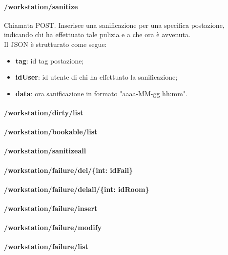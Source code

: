 \paragraph{/workstation/sanitize}
Chiamata POST. Inserisce una sanificazione per una specifica postazione, indicando chi ha effettuato tale pulizia e a che ora è avvenuta.\\
Il JSON è strutturato come segue:
\begin{itemize}
	\item \textbf{tag}: id tag postazione;
	\item \textbf{idUser}: id utente di chi ha effettuato la sanificazione;
	\item \textbf{data}: ora sanificazione in formato "aaaa-MM-gg hh:mm".
\end{itemize}

\paragraph{/workstation/dirty/list}
\paragraph{/workstation/bookable/list}
\paragraph{/workstation/sanitizeall}
\paragraph{/workstation/failure/del/\{int: idFail\}}
\paragraph{/workstation/failure/delall/\{int: idRoom\}}
\paragraph{/workstation/failure/insert}
\paragraph{/workstation/failure/modify}
\paragraph{/workstation/failure/list}

